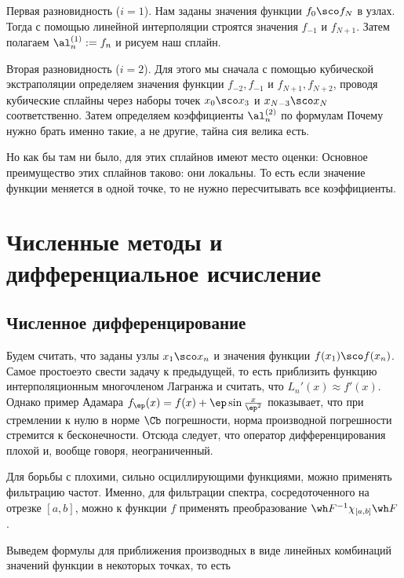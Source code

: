 \documentclass[a4paper]{article}
\begin{document}
Первая разновидность ($i = 1$). Нам заданы значения функции $f_0\sco f_N$ в узлах.
Тогда с помощью линейной интерполяции
строятся значения $f_{-1}$ и $f_{N+1}$. Затем полагаем $\al_n^{(1)} := f_n$
и рисуем наш сплайн.

Вторая разновидность ($i=2$). Для этого мы сначала с помощью кубической экстраполяции
определяем значения функции $f_{-2}, f_{-1}$ и $f_{N+1}, f_{N+2}$, проводя кубические сплайны
через наборы точек $x_0\sco x_3$ и $x_{N-3}\sco x_N$ соответственно.
Затем определяем коэффициенты $\al_n^{(2)}$ по формулам
Почему нужно брать именно такие, а не другие, тайна сия велика есть.

Но как бы там ни было, для этих сплайнов имеют место оценки:
Основное преимущество этих сплайнов таково: они локальны. То есть если значение
функции меняется в одной точке, то не нужно пересчитывать все коэффициенты.

\section{Численные методы и дифференциальное исчисление}

\subsection{Численное дифференцирование}

Будем считать, что заданы узлы $x_1\sco x_n$ и значения функции $f(x_1)\sco f(x_n)$.
Самое простое\т это свести задачу к предыдущей, то есть приблизить функцию интерполяционным
многочленом Лагранжа и считать, что $L_n'(x) \approx f'(x)$. Однако пример Адамара
$f_\ep(x) = f(x) + \ep\sin\frac{x}{\ep^2}$ показывает, что при стремлении к нулю в норме $\Cb$ погрешности,
норма производной погрешности стремится к бесконечности. Отсюда следует, что оператор дифференцирования
плохой и, вообще говоря, неограниченный.

Для борьбы с плохими, сильно осциллирующими функциями, можно применять фильтрацию частот.
Именно, для фильтрации спектра, сосредоточенного на отрезке $[a,b]$, можно к функции $f$ применять преобразование
$\wh F^{-1} \chi_{[a,b]}\wh F$.

Выведем формулы для приближения производных в виде линейных комбинаций значений функции  в некоторых точках, то
есть
\end{document}
